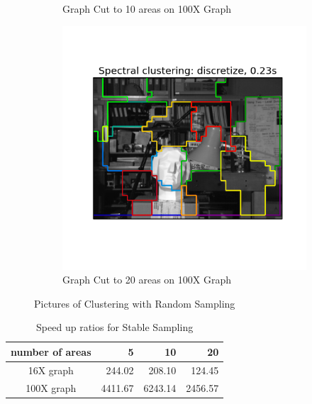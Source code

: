 \begin{figure}[h!]
\begin{subfigure}[h]{0.33\textwidth}
                \caption{Graph Cut to 10 areas on 100X Graph}
                \label{fig:graphcut_small_10}
        \end{subfigure}
        \begin{subfigure}[h]{0.33\textwidth}
                \includegraphics[width=\textwidth]{fig/592_small_20.png}
                \caption{Graph Cut to 20 areas on 100X Graph}
                \label{fig:graphcut_small_20}
        \end{subfigure}
        \caption{Pictures of Clustering with Random Sampling}\label{fig:graphcut}
\end{figure}

\begin{table}[h!]
{\centering\footnotesize
\begin{tabular}{|c|r|r|r|}
\hline
number of areas & 5 & 10  & 20 \\ \hline
16X graph & 244.02 & 208.10 & 124.45 \\ \hline
100X graph & 4411.67 & 6243.14 & 2456.57 \\ \hline
\end{tabular}
\captionsetup{font=footnotesize,labelfont=bf}
\caption{Speed up ratios for Stable Sampling}
\label{table:speedup}
}
\end{table}

